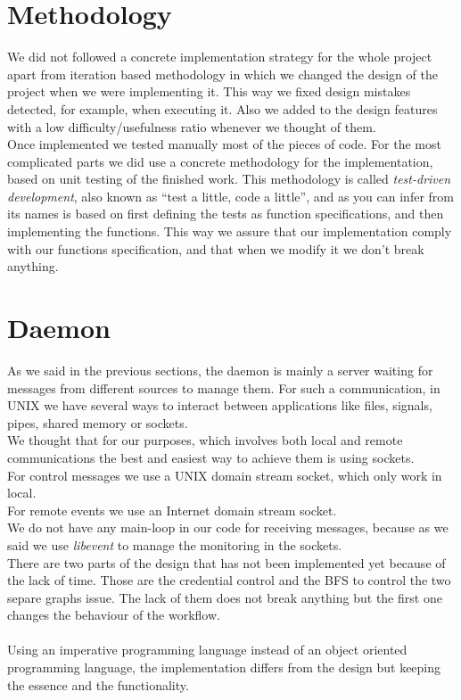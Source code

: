 \section{Methodology}
We did not followed a concrete implementation strategy for the whole project apart from iteration based methodology in which we changed
the design of the project when we were implementing it. This way we fixed design mistakes detected, for example, when executing it. Also we
added to the design features with a low difficulty/usefulness ratio whenever we thought of them.\\
Once implemented we tested manually most of the pieces of code. For the most complicated parts we did use a concrete methodology for the
implementation, based on unit testing of the finished work. This methodology is called \emph{test-driven development}, also known as
``test a little, code a little'', and as you can infer from its names is based on first defining the tests as function specifications, and
then implementing the functions. This way we assure that our implementation comply with our functions specification, and that when we 
modify it we don't break anything.
\section{Daemon}
\label{sec:impdaemon}
As we said in the previous sections, the daemon is mainly a server waiting for messages from different sources to manage them. For such
a communication, in UNIX we have several ways to interact between applications like files, signals, pipes, shared memory or sockets.\\
We thought that for our purposes, which involves both local and remote communications the best and easiest way to achieve them is 
using sockets.\\
For control messages we use a UNIX domain stream socket, which only work in local.\\
For remote events we use an Internet domain stream socket.\\
We do not have any main-loop in our code for receiving messages, because as we said we use \emph{libevent} to manage the monitoring in the
sockets.\\
There are two parts of the design that has not been implemented yet because of the lack of time. Those are the credential control and 
the BFS to control the two separe graphs issue. The lack of them does not break anything but the first one changes the behaviour of
the workflow.\\
\\
Using an imperative programming language instead of an object oriented programming language, the implementation differs from the design 
but keeping the essence and the functionality.
